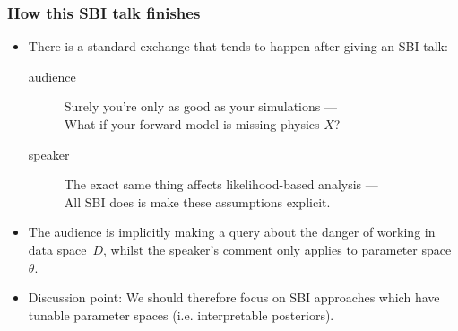 \documentclass[aspectratio=169]{beamer}
\begin{document}
\begin{frame}
    \frametitle{How this SBI talk finishes}
    \begin{itemize}
        \item There is a standard exchange that tends to happen after giving an SBI talk:

            \begin{description}
                \item[audience] Surely you're only as good as your simulations ---\\What if your forward model is missing physics $X$?
                \item[speaker] The exact same thing affects likelihood-based analysis ---\\
                    All SBI does is make these assumptions explicit.
            \end{description}
        \item The audience is implicitly making a query about the danger of working in data space~$D$, whilst the speaker's comment only applies to parameter space $\theta$.
        \item Discussion point: We should therefore focus on SBI approaches which have tunable parameter spaces (i.e. interpretable posteriors).
    \end{itemize}
\end{frame}
\end{document}
